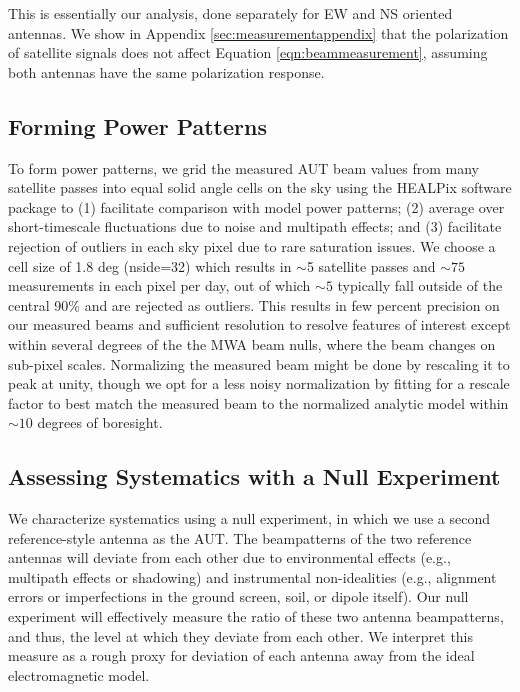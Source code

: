 This is essentially our analysis, done separately for EW and NS oriented antennas. We show in Appendix \ref{sec:measurementappendix} that the polarization of satellite signals does not affect Equation \ref{eqn:beammeasurement}, assuming both antennas have the same polarization response.

\subsection{Forming Power Patterns}
\label{sec:formingpowerpatterns}

To form power patterns, we grid the measured AUT beam values from many satellite passes into equal solid angle cells on the sky using the HEALPix software package \citep{healpix} to (1) facilitate comparison with model power patterns; (2) average over short-timescale fluctuations due to noise and multipath effects; and (3) facilitate rejection of outliers in each sky pixel due to rare saturation issues. We choose a cell size of 1.8 deg (nside=32) which results in $\sim$5 satellite passes and $\sim75$ measurements in each pixel per day, out of which $\sim5$ typically fall outside of the central 90\% and are rejected as outliers. This results in few percent precision on our measured beams and sufficient resolution to resolve features of interest except within several degrees of the the MWA beam nulls, where the beam changes on sub-pixel scales.  Normalizing the measured beam might be done by rescaling it to peak at unity, though we opt for a less noisy normalization by fitting for a rescale factor to best match the measured beam to the normalized analytic model within $\sim10$ degrees of boresight. 

\subsection{Assessing Systematics with a Null Experiment}
\label{sec:nullexpt}

We characterize systematics using a null experiment, in which we use a second reference-style antenna as the AUT. The beampatterns of the two reference antennas will deviate from each other due to environmental effects (e.g., multipath effects or shadowing) and instrumental non-idealities (e.g., alignment errors or imperfections in the ground screen, soil, or dipole itself). Our null experiment will effectively measure the ratio of these two antenna beampatterns, and thus, the level at which they deviate from each other. We interpret this measure as a rough proxy for deviation of each antenna away from the ideal electromagnetic model.

